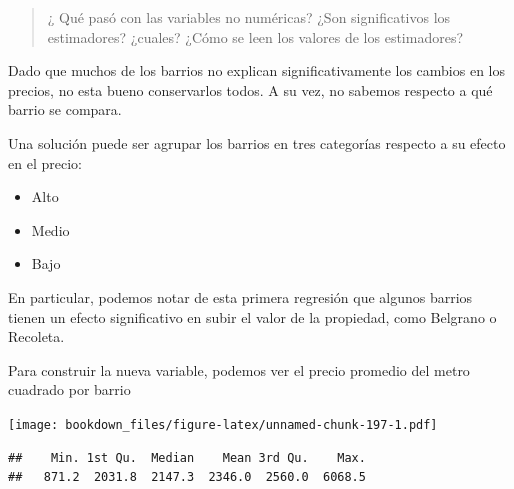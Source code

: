 \documentclass[]{book}
\newenvironment{Shaded}{\begin{snugshade}}{\end{snugshade}}
\newcommand{\DataTypeTok}[1]{\textcolor[rgb]{0.13,0.29,0.53}{#1}}
\newcommand{\KeywordTok}[1]{\textcolor[rgb]{0.13,0.29,0.53}{\textbf{#1}}}
\newcommand{\NormalTok}[1]{#1}
\newcommand{\OperatorTok}[1]{\textcolor[rgb]{0.81,0.36,0.00}{\textbf{#1}}}
\newcommand{\StringTok}[1]{\textcolor[rgb]{0.31,0.60,0.02}{#1}}
\providecommand{\tightlist}{%
  \setlength{\itemsep}{0pt}\setlength{\parskip}{0pt}}
\begin{document}
\begin{quote}
¿ Qué pasó con las variables no numéricas?
¿Son significativos los estimadores? ¿cuales?
¿Cómo se leen los valores de los estimadores?
\end{quote}

Dado que muchos de los barrios no explican significativamente los cambios en los precios, no esta bueno conservarlos todos. A su vez, no sabemos respecto a qué barrio se compara.

Una solución puede ser agrupar los barrios en tres categorías respecto a su efecto en el precio:

\begin{itemize}
\tightlist
\item
  Alto
\item
  Medio
\item
  Bajo
\end{itemize}

En particular, podemos notar de esta primera regresión que algunos barrios tienen un efecto significativo en subir el valor de la propiedad, como Belgrano o Recoleta.

Para construir la nueva variable, podemos ver el precio promedio del metro cuadrado por barrio

\begin{Shaded}
\end{Shaded}

\texttt{[image: bookdown\_files/figure-latex/unnamed-chunk-197-1.pdf]}

\begin{Shaded}
\end{Shaded}

\begin{verbatim}
##    Min. 1st Qu.  Median    Mean 3rd Qu.    Max. 
##   871.2  2031.8  2147.3  2346.0  2560.0  6068.5
\end{verbatim}
\end{document}
